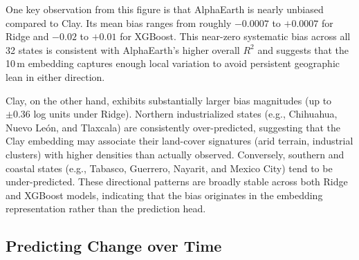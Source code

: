 \documentclass[12pt,letterpaper]{article}
\begin{document}
One key observation from this figure is that AlphaEarth is nearly unbiased compared to Clay. Its mean bias ranges from roughly $-0.0007$ to $+0.0007$ for Ridge and $-0.02$ to $+0.01$ for XGBoost. This near-zero systematic bias across all 32 states is consistent with AlphaEarth's higher overall $R^2$ and suggests that the 10\,m embedding captures enough local variation to avoid persistent geographic lean in either direction.

Clay, on the other hand, exhibits substantially larger bias magnitudes (up to $\pm 0.36$ log units under Ridge). Northern industrialized states (e.g., Chihuahua, Nuevo León, and Tlaxcala) are consistently over-predicted, suggesting that the Clay embedding may associate their land-cover signatures (arid terrain, industrial clusters) with higher densities than actually observed. Conversely, southern and coastal states (e.g., Tabasco, Guerrero, Nayarit, and Mexico City) tend to be under-predicted. These directional patterns are broadly stable across both Ridge and XGBoost models, indicating that the bias originates in the embedding representation rather than the prediction head.







\subsection{Predicting Change over Time}
\end{document}
